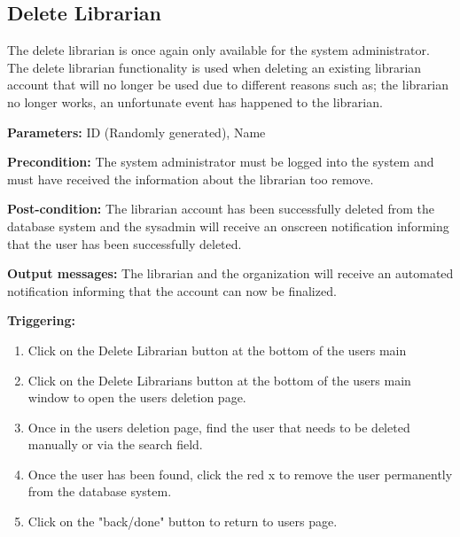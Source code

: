 \documentclass{article}
\begin{document}
\subsection{Delete Librarian}

The delete librarian is once again only available for the system administrator. The delete librarian functionality is used when deleting an existing librarian account that will no longer be used due to different reasons such as; the librarian no longer works, an unfortunate event has happened to the librarian.

\begin{description}

\item \textbf{Parameters:} ID (Randomly generated), Name

\item \textbf{Precondition:} The system administrator must be logged into the system and must have received the information about the librarian too remove. 

\item \textbf{Post-condition:} The librarian account has been
successfully deleted from the database system and the sysadmin will receive an
onscreen notification informing that the user has been successfully deleted.

\item \textbf{Output messages:} The librarian and the organization will receive an automated notification informing that the account can now be finalized. 

\item \textbf{Triggering:}
\begin{enumerate}

\item Click on the Delete Librarian button at the bottom of the users main

\item Click on the Delete Librarians button at the bottom of the users main
window to open the users deletion page.

\item Once in the users deletion page, find the user that needs to be deleted manually or via the search field.

\item Once the user has been found, click the red x to remove the user permanently from the database system. 

\item Click on the "back/done" button to return to users page.

\end{enumerate}

\end{description}
\end{document}
